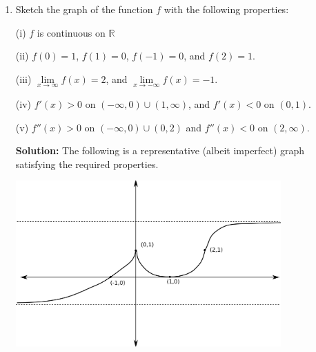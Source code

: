 \documentclass[letterpaper,12pt]{article}
\begin{document}
\begin{enumerate}
\item Sketch the graph of the function $f$ with the following properties:

(i) $f$ is continuous on $\mathbb{R}$


(ii) $f(0)=1$, $f(1)=0$, $f(-1)=0$, and $f(2)=1$. 


(iii) $\lim\limits_{x\to \infty}f(x)=2$, and $\lim\limits_{x\to -\infty}f(x)=-1$.


(iv) $f'(x)>0$ on $(-\infty, 0)\cup (1,\infty)$, and $f'(x)<0$ on $(0,1)$.


(v) $f''(x)>0$ on $(-\infty,0)\cup (0,2)$ and $f''(x)<0$ on $(2,\infty)$.

\bigskip

\textbf{Solution:} The following is a representative (albeit imperfect) graph satisfying the required properties.
\begin{center}
\includegraphics[width=0.8\textwidth]{A3_3}
\end{center}
 \end{enumerate}
\end{document}
